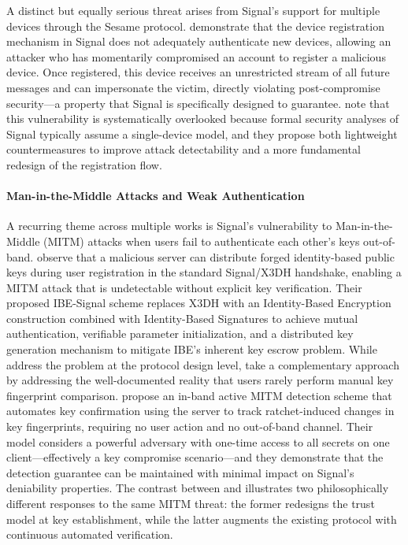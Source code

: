 A distinct but equally serious threat arises from Signal's support for multiple devices through the Sesame protocol. \textcite{wichelmann2021} demonstrate that the device registration mechanism in Signal does not adequately authenticate new devices, allowing an attacker who has momentarily compromised an account to register a malicious device. Once registered, this device receives an unrestricted stream of all future messages and can impersonate the victim, directly violating post-compromise security—a property that Signal is specifically designed to guarantee. \textcite{wichelmann2021} note that this vulnerability is systematically overlooked because formal security analyses of Signal typically assume a single-device model, and they propose both lightweight countermeasures to improve attack detectability and a more fundamental redesign of the registration flow.

\paragraph{Man-in-the-Middle Attacks and Weak Authentication}

A recurring theme across multiple works is Signal's vulnerability to Man-in-the-Middle (MITM) attacks when users fail to authenticate each other's keys out-of-band. \textcite{liu2022} observe that a malicious server can distribute forged identity-based public keys during user registration in the standard Signal/X3DH handshake, enabling a MITM attack that is undetectable without explicit key verification. Their proposed IBE-Signal scheme replaces X3DH with an Identity-Based Encryption construction combined with Identity-Based Signatures to achieve mutual authentication, verifiable parameter initialization, and a distributed key generation mechanism to mitigate IBE's inherent key escrow problem. While \textcite{liu2022} address the problem at the protocol design level, \textcite{teng2024} take a complementary approach by addressing the well-documented reality that users rarely perform manual key fingerprint comparison. \textcite{teng2024} propose an in-band active MITM detection scheme that automates key confirmation using the server to track ratchet-induced changes in key fingerprints, requiring no user action and no out-of-band channel. Their model considers a powerful adversary with one-time access to all secrets on one client—effectively a key compromise scenario—and they demonstrate that the detection guarantee can be maintained with minimal impact on Signal's deniability properties. The contrast between \textcite{liu2022} and \textcite{teng2024} illustrates two philosophically different responses to the same MITM threat: the former redesigns the trust model at key establishment, while the latter augments the existing protocol with continuous automated verification.

